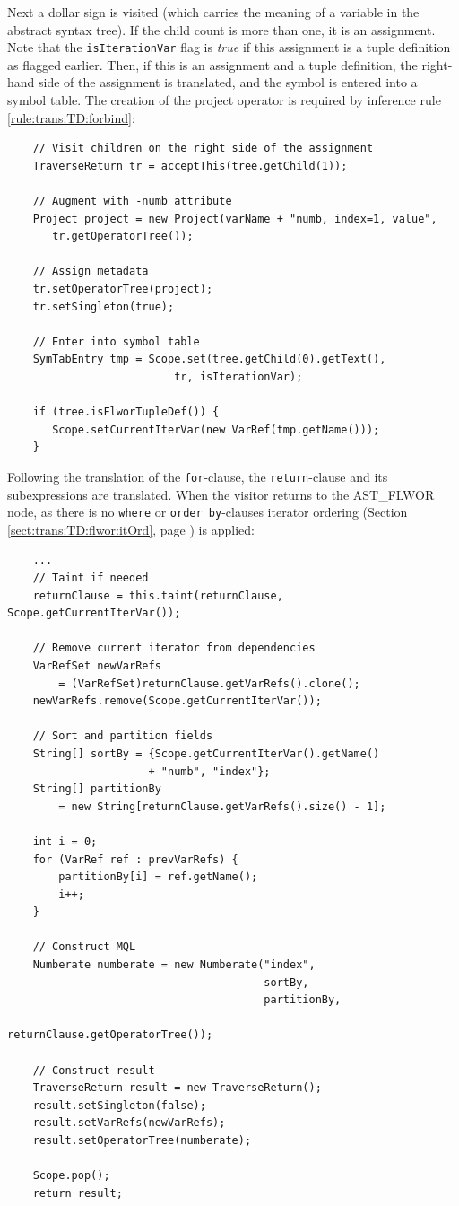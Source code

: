 Next a dollar sign is visited (which carries the meaning of a variable in the
abstract syntax tree). If the child count is more than one, it is an
assignment. Note that the \texttt{isIterationVar} flag is \textit{true} if
this assignment is a tuple definition as flagged earlier. Then, if this is an
assignment and a tuple definition, the right-hand side of the assignment is
translated, and the symbol is entered into a symbol table. The
creation of the project operator is required by inference rule
\ref{rule:trans:TD:forbind}:

\begin{Verbatim}     
    // Visit children on the right side of the assignment
    TraverseReturn tr = acceptThis(tree.getChild(1));
        
    // Augment with -numb attribute
    Project project = new Project(varName + "numb, index=1, value", 
       tr.getOperatorTree());

    // Assign metadata
    tr.setOperatorTree(project);
    tr.setSingleton(true);
     
    // Enter into symbol table
    SymTabEntry tmp = Scope.set(tree.getChild(0).getText(), 
                          tr, isIterationVar);
     
    if (tree.isFlworTupleDef()) {
       Scope.setCurrentIterVar(new VarRef(tmp.getName()));
    }
\end{Verbatim}



Following the translation of the \texttt{for}-clause, the
\texttt{return}-clause and its subexpressions are translated. When the visitor returns to the AST\_FLWOR node, as there is no \texttt{where} or \texttt{order
by}-clauses iterator ordering (Section \ref{sect:trans:TD:flwor:itOrd}, page \pageref{sect:trans:TD:flwor:itOrd})
is applied:

\begin{Verbatim}
    ...
    // Taint if needed
    returnClause = this.taint(returnClause, Scope.getCurrentIterVar());

    // Remove current iterator from dependencies
    VarRefSet newVarRefs 
    	= (VarRefSet)returnClause.getVarRefs().clone();         
    newVarRefs.remove(Scope.getCurrentIterVar());

    // Sort and partition fields
    String[] sortBy = {Scope.getCurrentIterVar().getName() 
    		          + "numb", "index"};
    String[] partitionBy 
    	= new String[returnClause.getVarRefs().size() - 1];

    int i = 0;
    for (VarRef ref : prevVarRefs) {
        partitionBy[i] = ref.getName();
        i++;
    }

    // Construct MQL
    Numberate numberate = new Numberate("index", 
                                        sortBy, 
                                        partitionBy, 
                                        returnClause.getOperatorTree());

    // Construct result
    TraverseReturn result = new TraverseReturn();
    result.setSingleton(false);
    result.setVarRefs(newVarRefs);
    result.setOperatorTree(numberate);

    Scope.pop();
    return result;
\end{Verbatim}

